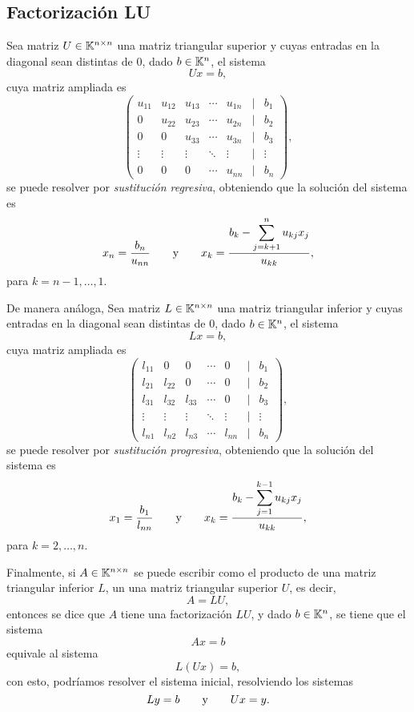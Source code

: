 \documentclass[a4,11pt]{aleph-notas}
\begin{document}
\subsection{Factorización LU}

Sea matriz $U\in\Mat[\K]{n}{n}$ una matriz triangular superior y cuyas entradas en la diagonal sean distintas de $0$, dado $b\in\K^n$, el sistema 
\[
    Ux = b,
\]
cuya matriz ampliada es
\[
    \begin{pmatrix}
        u_{11} & u_{12} & u_{13} & \cdots & u_{1n} & | & b_1 \\
        0      & u_{22} & u_{23} & \cdots & u_{2n} & | & b_2 \\
        0      & 0      & u_{33} & \cdots & u_{3n} & | & b_3 \\
        \vdots & \vdots & \vdots & \ddots & \vdots & | & \vdots \\
        0      & 0      & 0      & \cdots & u_{nn} & | & b_n 
    \end{pmatrix},
\]
se puede resolver por \emph{sustitución regresiva}, obteniendo que la solución del sistema es
\[
    x_n = \frac{b_n}{u_{nn}}
    \texty
    x_k = \dfrac{b_k - \displaystyle\sum_{j=k+1}^n u_{kj}x_j}{u_{kk}},
\]
para $k=n-1,\ldots,1$.

De manera análoga, Sea matriz $L\in\Mat[\K]{n}{n}$ una matriz triangular inferior y cuyas entradas en la diagonal sean distintas de $0$, dado $b\in\K^n$, el sistema 
\[
    Lx = b,
\]
cuya matriz ampliada es
\[
    \begin{pmatrix}
        l_{11} & 0      & 0      & \cdots & 0      & | & b_1 \\
        l_{21} & l_{22} & 0      & \cdots & 0      & | & b_2 \\
        l_{31} & l_{32} & l_{33} & \cdots & 0      & | & b_3 \\
        \vdots & \vdots & \vdots & \ddots & \vdots & | & \vdots \\
        l_{n1} & l_{n2} & l_{n3} & \cdots & l_{nn} & | & b_n 
    \end{pmatrix},
\]
se puede resolver por \emph{sustitución progresiva}, obteniendo que la solución del sistema es
\[
    x_1 = \frac{b_1}{l_{nn}}
    \texty
    x_k = \dfrac{b_k - \displaystyle\sum_{j=1}^{k-1} u_{kj}x_j}{u_{kk}},
\]
para $k=2,\ldots,n$.

Finalmente, si $A \in \Mat[\K]{n}{n}$ se puede escribir como el producto de una matriz triangular inferior $L$, un una matriz triangular superior $U$, es decir, 
\[
    A = LU,
\]
entonces se dice que $A$ tiene una factorización $LU$, y dado $b\in\K^n$, se tiene que el sistema
\[
    Ax=b
\]
equivale al sistema
\[
    L(Ux) = b,
\]
con esto, podríamos resolver el sistema inicial, resolviendo los sistemas
\[
    Ly = b
    \texty
    Ux = y.
\]
\end{document}
